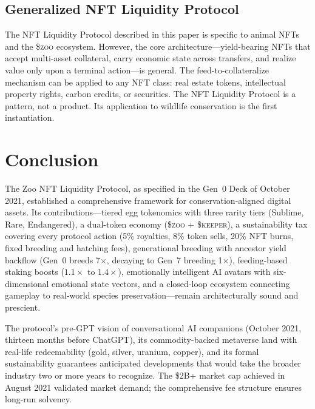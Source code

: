 \documentclass[11pt,letterpaper]{article}
\newcommand{\ZOO}{\$\textsc{zoo}}
\newcommand{\KEEPER}{\$\textsc{keeper}}
\begin{document}
\subsection{Generalized NFT Liquidity Protocol}

The NFT Liquidity Protocol described in this paper is specific to animal NFTs and the
\ZOO{} ecosystem.  However, the core architecture---yield-bearing NFTs that accept
multi-asset collateral, carry economic state across transfers, and realize value only
upon a terminal action---is general.  The feed-to-collateralize mechanism
can be applied to any NFT class: real estate tokens, intellectual property rights,
carbon credits, or securities.  The NFT Liquidity Protocol is a pattern, not a product.  Its application to wildlife conservation is the first instantiation.

\section{Conclusion}
\label{sec:conclusion}

The Zoo NFT Liquidity Protocol, as specified in the Gen~0 Deck of October 2021, established a comprehensive framework for conservation-aligned digital assets.  Its contributions---tiered egg tokenomics with three rarity tiers (Sublime, Rare, Endangered), a dual-token economy (\ZOO{} + \KEEPER{}), a sustainability tax covering every protocol action (5\% royalties, 8\% token sells, 20\% NFT burns, fixed breeding and hatching fees), generational breeding with ancestor yield backflow (Gen~0 breeds 7$\times$, decaying to Gen~7 breeding 1$\times$), feeding-based staking boosts ($1.1\times$ to $1.4\times$), emotionally intelligent AI avatars with six-dimensional emotional state vectors, and a closed-loop ecosystem connecting gameplay to real-world species preservation---remain architecturally sound and prescient.

The protocol's pre-GPT vision of conversational AI companions (October 2021, thirteen months before ChatGPT), its commodity-backed metaverse land with real-life redeemability (gold, silver, uranium, copper), and its formal sustainability guarantees anticipated developments that would take the broader industry two or more years to recognize.  The \$2B+ market cap achieved in August 2021 validated market demand; the comprehensive fee structure ensures long-run solvency.
\end{document}

